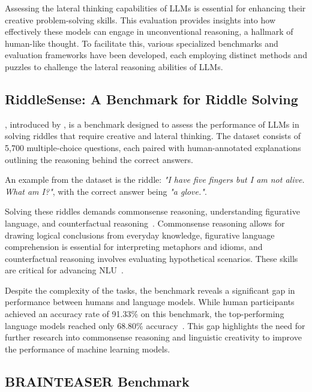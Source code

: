 Assessing the lateral thinking capabilities of \acp{LLM} is essential for enhancing their creative problem-solving skills. This evaluation provides insights into how effectively these models can engage in unconventional reasoning, a hallmark of human-like thought. To facilitate this, various specialized benchmarks and evaluation frameworks have been developed, each employing distinct methods and puzzles to challenge the lateral reasoning abilities of \acp{LLM}.

\subsection{RiddleSense: A Benchmark for Riddle Solving}

, introduced by \textcite{linRiddleSenseReasoningRiddle2021}, is a benchmark designed to assess the performance of \acp{LLM} in solving riddles that require creative and lateral thinking. The dataset consists of 5,700 multiple-choice questions, each paired with human-annotated explanations outlining the reasoning behind the correct answers.

An example from the dataset is the riddle: \textit{"I have five fingers but I am not alive. What am I?"}, with the correct answer being \textit{"a glove."}.

Solving these riddles demands commonsense reasoning, understanding figurative language, and counterfactual reasoning~\cite{linRiddleSenseReasoningRiddle2021}. Commonsense reasoning allows for drawing logical conclusions from everyday knowledge, figurative language comprehension is essential for interpreting metaphors and idioms, and counterfactual reasoning involves evaluating hypothetical scenarios. These skills are critical for advancing \ac{NLU}~\cite{linRiddleSenseReasoningRiddle2021}.

Despite the complexity of the tasks, the benchmark reveals a significant gap in performance between humans and language models. While human participants achieved an accuracy rate of 91.33\% on this benchmark, the top-performing language models reached only 68.80\% accuracy~\cite{linRiddleSenseReasoningRiddle2021}. This gap highlights the need for further research into commonsense reasoning and linguistic creativity to improve the performance of machine learning models.

\subsection{BRAINTEASER Benchmark}

